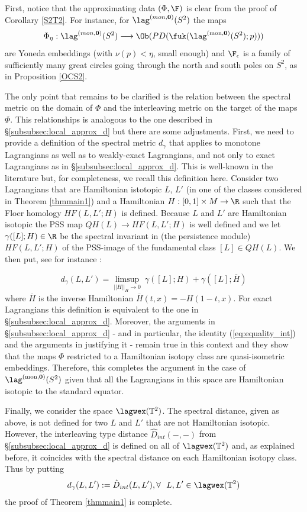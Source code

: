 First, notice that the approximating data $(\Phi, \F)$ is clear from the proof of Corollary \ref{S2T2}. For instance, for $\lag^{(mon,\bf{0})}(S^{2})$ the maps
$$\Phi_{\eta} : \lag^{(mon,\bf{0})}(S^{2})\longrightarrow \Ob (PD(\fuk(\lag^{\text{(mon,} \mathbf{0} \text{)}}(S^2);p)))$$ are Yoneda embeddings (with $\nu(p) < \eta$, small enough)
and $\F_{\epsilon}$ is a family of sufficiently many great circles going through the north
and south poles on $S^{2}$, as in Proposition \ref{OCS2}.

The only point that remains to be clarified is the relation between the spectral metric on the domain of $\Phi$ and the interleaving metric on the target of the maps $\Phi$.
This relationships is analogous to the one described in \S\ref{subsubsec:local_approx_d} but there 
are some adjustments. 
First, we need to provide a definition of the spectral metric $d_{\gamma}$ that applies to monotone Lagrangians as well as to weakly-exact Lagrangians, and not only to exact Lagrangians
as in \S\ref{subsubsec:local_approx_d}. This is well-known in the literature but, for completeness, we recall this definition here. Consider two Lagrangians that are Hamiltonian istotopic $L$, $L'$ (in one of the classes considered in Theorem \ref{thmmain1})  and a Hamiltonian $H:[0,1]\times M\to \R$ such that the Floer homology $HF(L,L';H)$ is defined. Because $L$ and $L'$ are Hamiltonian isotopic the PSS map  
$QH(L)\to HF(L,L';H)$ is well defined and we let $\gamma ([L];H)\in \R$ be the spectral
invariant in (the persistence module) $HF(L,L';H)$ of the PSS-image of the fundamental class $[L]\in QH(L)$.  We then put, see for instance \cite{Kis-Sh}:

$$d_{\gamma}(L,L')=\limsup_{||H||_{H}\to 0}\  \gamma([L]; H)+ \gamma([L];\overline{H})$$
where $\overline{H}$ is the inverse Hamiltonian $\overline{H}(t,x)=-H(1-t,x)$.
For exact Lagrangians this definition is equivalent to the one in \S\ref{subsubsec:local_approx_d}.
Moreover, the arguments in \S\ref{subsubsec:local_approx_d} -  and in particular, the identity (\ref{eq:equality_int})  and the arguments in \cite{BCZ:tpc} justifying it -  remain true in this context and they show that the maps $\Phi$  restricted to a Hamiltonian isotopy class  are quasi-isometric embeddings. Therefore, this completes the argument
in the case of $\lag^{\text{(mon,} \mathbf{0} \text{)}}(S^2)$ given that all the Lagrangians in this space are Hamiltonian isotopic to the standard equator.

Finally, we consider the space $\lagwex(\mathbb{T}^2)$. The spectral distance, given as above, 
is not defined for two $L$ and $L'$ that are not Hamiltonian isotopic. However, the interleaving type distance $\hat{D}_{int}(-,-)$ from \S\ref{subsubsec:local_approx_d} is defined  on all of
$\lagwex(\mathbb{T}^2)$ and, as explained before, it coincides with the spectral distance on each Hamiltonian isotopy class. Thus
by putting
$$d_{\gamma} (L,L'):= \hat{D}_{int} (L,L'), \forall \ \ L , L'\in \lagwex(\mathbb{T}^2)$$
the proof of Theorem \ref{thmmain1} is complete.

